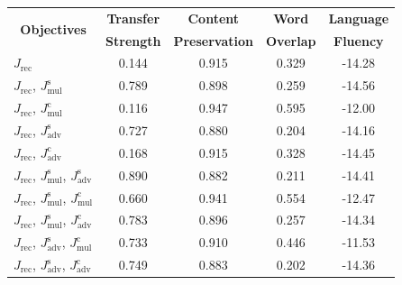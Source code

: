 \documentclass[letterpaper]{article} %
\newcommand{\tabh}[1]{\multicolumn{1}{c|}{\textbf{#1}}}
\newcommand{\tabc}[2]{\multicolumn{1}{|c||}{\multirow{#1}{*}{\textbf{#2}}}}
\newcommand{\loss}[2]{J_{\text{#1}}^{\text{#2}}}
\begin{document}
\begin{table}[ht]
	\centering
	\begin{tabular}{| l || c | c | c | c |}
		\hline
		\tabc{2}{Objectives}                                                               & \tabh{Transfer} & \tabh{Content}      & \tabh{Word}    & \tabh{Language} \\
		                                                                                   & \tabh{Strength} & \tabh{Preservation} & \tabh{Overlap} & \tabh{Fluency}  \\
		\hline
		\hline
		$\loss{rec}{}$                                                                     & 0.144           & 0.915               & 0.329          & -14.28          \\
		\hline
		$\loss{rec}{}$, $\loss{mul}{s}$                                                    & 0.789           & 0.898               & 0.259          & -14.56          \\
		\hline
		$\loss{rec}{}$, $\loss{mul}{c}$                                                    & 0.116           & 0.947               & 0.595          & -12.00          \\
		\hline
		$\loss{rec}{}$, $\loss{adv}{s}$                                                    & 0.727           & 0.880               & 0.204          & -14.16          \\
		\hline
		$\loss{rec}{}$, $\loss{adv}{c}$                                                    & 0.168           & 0.915               & 0.328          & -14.45          \\
		\hline
		$\loss{rec}{}$, $\loss{mul}{s}$, $\loss{adv}{s}$                                   & 0.890           & 0.882               & 0.211          & -14.41          \\
		\hline
		$\loss{rec}{}$, $\loss{mul}{s}$, $\loss{mul}{c}$                                   & 0.660           & 0.941               & 0.554          & -12.47          \\
		\hline
		$\loss{rec}{}$, $\loss{mul}{s}$, $\loss{adv}{c}$                                   & 0.783           & 0.896               & 0.257          & -14.34          \\
		\hline
		$\loss{rec}{}$, $\loss{adv}{s}$, $\loss{mul}{c}$                                   & 0.733           & 0.910               & 0.446          & -11.53          \\
		\hline
		$\loss{rec}{}$, $\loss{adv}{s}$, $\loss{adv}{c}$                                   & 0.749           & 0.883               & 0.202          & -14.36          \\

\end{tabular}
\end{table}
\end{document}
